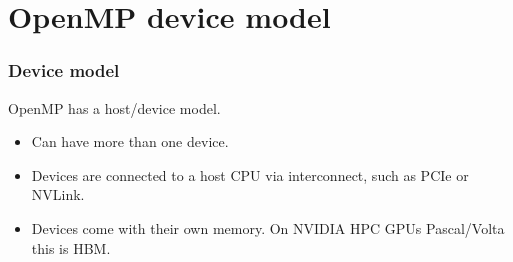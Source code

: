 \documentclass[aspectratio=169]{beamer}
\begin{document}
\section{OpenMP device model}
\begin{frame}
\frametitle{Device model}
OpenMP has a host/device model.

\begin{center}
\end{center}

\begin{itemize}
  \item Can have more than one device.
  \item Devices are connected to a host CPU via interconnect, such as PCIe or NVLink.
  \item Devices come with their own memory. On NVIDIA HPC GPUs Pascal/Volta this is HBM.
\end{itemize}


\end{frame}
\end{document}
